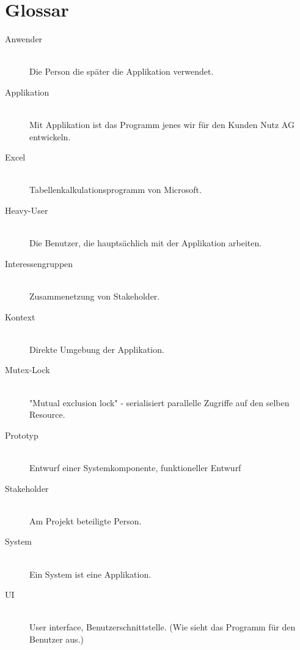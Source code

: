 \section{Glossar}
\begin{description}
	\item[Anwender] \hfill \\
	Die Person die später die Applikation verwendet.
	\item[Applikation] \hfill \\
    Mit Applikation ist das Programm jenes wir für den Kunden Nutz AG entwickeln.
    \item[Excel] \hfill \\
	Tabellenkalkulationsprogramm von Microsoft.
	\item[Heavy-User] \hfill \\
    Die Benutzer, die hauptsächlich mit der Applikation arbeiten.
    \item[Interessengruppen] \hfill \\
    Zusammenetzung von Stakeholder.
    \item[Kontext] \hfill \\
    Direkte Umgebung der Applikation.
    \item[Mutex-Lock] \hfill \\
    "Mutual exclusion lock" - serialisiert parallelle Zugriffe auf den selben Resource.
    \item[Prototyp] \hfill \\
	Entwurf einer Systemkomponente, funktioneller Entwurf
	\item[Stakeholder] \hfill \\
    Am Projekt beteiligte Person.
    \item[System] \hfill \\
    Ein System ist eine Applikation.
    \item[UI] \hfill \\
    User interface, Benutzerschnittstelle. (Wie sieht das Programm für den Benutzer aus.)
    
\end{description}
